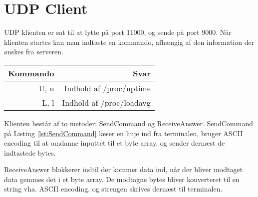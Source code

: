 \section{UDP Client}
UDP klienten er sat til at lytte på port 11000, og sende på port 9000. Når klienten startes kan man indtaste en kommando, afhængig af den information der ønskes fra serveren. \\

\begin{tabular}{r|r}
\hline
    Kommando & Svar  \\ \hline
    U, u & Indhold af /proc/uptime \\ \hline
    L, l & Indhold af /proc/loadavg \\
\hline
\end{tabular}
\vspace{.5cm}


Klienten består af to metoder: SendCommand og ReceiveAnswer. SendCommand på Listing \ref{lst:SendCommand} læser en linje ind fra terminalen, bruger ASCII encoding til at omdanne inputtet til et byte array, og sender dernæst de indtastede bytes.



ReceiveAnswer blokkerer indtil der kommer data ind, når der bliver modtaget data gemmes det i et byte array. De modtagne bytes bliver konverteret til en string vha. ASCII encoding, og strengen skrives dernæst til terminalen.

